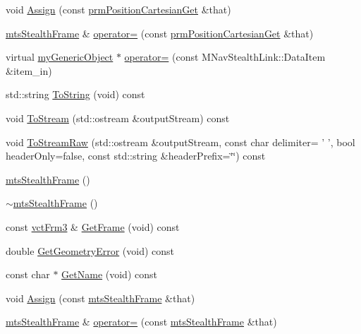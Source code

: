 \begin{DoxyCompactItemize}
void \hyperlink{classmts_stealth_frame_ae570300bb135a8e9ab81d81e5456c552}{Assign} (const \hyperlink{classprm_position_cartesian_get}{prm\-Position\-Cartesian\-Get} \&that)
\item 
\hyperlink{classmts_stealth_frame}{mts\-Stealth\-Frame} \& \hyperlink{classmts_stealth_frame_a8350558bec876d3c65c609aecf3e2512}{operator=} (const \hyperlink{classprm_position_cartesian_get}{prm\-Position\-Cartesian\-Get} \&that)
\item 
virtual \hyperlink{classmy_generic_object}{my\-Generic\-Object} $\ast$ \hyperlink{classmts_stealth_frame_abcc4616c433c7c6fa4c3fa419c909e28}{operator=} (const M\-Nav\-Stealth\-Link\-::\-Data\-Item \&item\-\_\-in)
\item 
std\-::string \hyperlink{classmts_stealth_frame_a04cfb56c66017fc8029c81ac91655e26}{To\-String} (void) const 
\item 
void \hyperlink{classmts_stealth_frame_ac6f6690c08ffaaad27f589a7dae4da28}{To\-Stream} (std\-::ostream \&output\-Stream) const 
\item 
void \hyperlink{classmts_stealth_frame_a0b6205e28c29ccc0ba25c553bea02419}{To\-Stream\-Raw} (std\-::ostream \&output\-Stream, const char delimiter= ' ', bool header\-Only=false, const std\-::string \&header\-Prefix=\char`\"{}\char`\"{}) const 
\item 
\hyperlink{classmts_stealth_frame_af32afe61af4982beef829344c6b96aea}{mts\-Stealth\-Frame} ()
\item 
\hyperlink{classmts_stealth_frame_a2ddd4401f06f843058dbfe2042dc2788}{$\sim$mts\-Stealth\-Frame} ()
\item 
const \hyperlink{vct_transformation_types_8h_a81feda0a02c2d1bc26e5553f409fed20}{vct\-Frm3} \& \hyperlink{classmts_stealth_frame_a9834fbe11a6dc5971a25d3a892620e89}{Get\-Frame} (void) const 
\item 
double \hyperlink{classmts_stealth_frame_a20ebeeaf561c90fb0be2924c02b230e3}{Get\-Geometry\-Error} (void) const 
\item 
const char $\ast$ \hyperlink{classmts_stealth_frame_ab2bdd6399b97c6558824f1feebdba73c}{Get\-Name} (void) const 
\item 
void \hyperlink{classmts_stealth_frame_a1c6b3490139cd399ae5c350cb97f8955}{Assign} (const \hyperlink{classmts_stealth_frame}{mts\-Stealth\-Frame} \&that)
\item 
\hyperlink{classmts_stealth_frame}{mts\-Stealth\-Frame} \& \hyperlink{classmts_stealth_frame_af158556b959ea14edbd87519613df304}{operator=} (const \hyperlink{classmts_stealth_frame}{mts\-Stealth\-Frame} \&that)

\end{DoxyCompactItemize}

